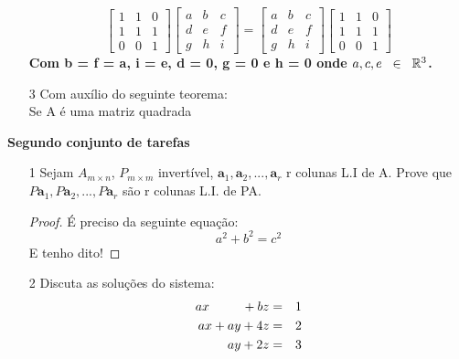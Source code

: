 \documentclass[11pt]{article}
\begin{document}
\begin{itemize}
$$
\begin{bmatrix}
1&1&0\\1&1&1\\0&0&1
\end{bmatrix}
\begin{bmatrix}
a&b&c\\d&e&f\\g&h&i
\end{bmatrix}
=
\begin{bmatrix}
a&b&c\\d&e&f\\g&h&i
\end{bmatrix}
\begin{bmatrix}
1&1&0\\1&1&1\\0&0&1
\end{bmatrix}
$$
\textbf{Com b = f = a, i = e, d = 0, g = 0 e h = 0 onde $a,c,e\hspace{2mm}\in\hspace{2mm}\mathbb{R}^3$.}

\item[3] Com auxílio do seguinte teorema:
\\ Se A é uma matriz quadrada
\end{itemize}

\begin{center}
{\LARGE \textbf{Segundo conjunto de tarefas}}
\end{center}

\begin{itemize}
\item[1] Sejam $A_{m \times n}$, $P_{m \times m}$ invertível, $\textbf{a}_1, \textbf{a}_2, ..., \textbf{a}_r$ r colunas L.I de A. Prove que $P\textbf{a}_1,P\textbf{a}_2,...,P\textbf{a}_r$ são r colunas L.I. de PA.
\begin{proof}
É preciso da seguinte equação:
\[
a^2 + b^2 = c^2
\]
E tenho dito! \qedhere
\end{proof}

\item[2] Discuta as soluções do sistema:
\begin{eqnarray*} 
ax \hspace{9mm} +bz &=&1\\
ax+ay+4z&=&2\\
ay+2z&=&3 
\end{eqnarray*}
\end{itemize}
\end{document}
